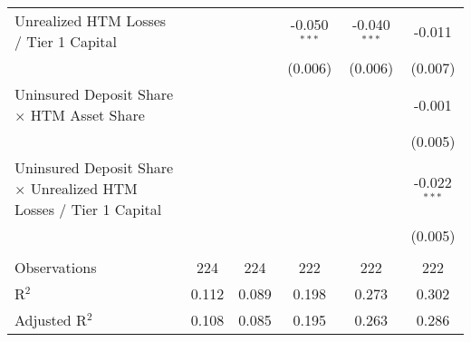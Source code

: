 \begin{table}[htbp]
\begin{adjustbox}{width = 1.2\textwidth, center}
\begin{tabular}{lccccc}
         Unrealized HTM Losses / Tier 1 Capital                                   &                &                & -0.050$^{***}$ & -0.040$^{***}$ & -0.011\\   
                                                                                  &                &                & (0.006)        & (0.006)        & (0.007)\\   
         Uninsured Deposit Share $\times$ HTM Asset Share                         &                &                &                &                & -0.001\\   
                                                                                  &                &                &                &                & (0.005)\\   
         Uninsured Deposit Share $\times$ Unrealized HTM Losses / Tier 1 Capital  &                &                &                &                & -0.022$^{***}$\\   
                                                                                  &                &                &                &                & (0.005)\\   
          \\
         Observations                                                             & 224            & 224            & 222            & 222            & 222\\  
         R$^2$                                                                    & 0.112          & 0.089          & 0.198          & 0.273          & 0.302\\  
         Adjusted R$^2$                                                           & 0.108          & 0.085          & 0.195          & 0.263          & 0.286\\  
         \bottomrule
      \end{tabular}
   \end{adjustbox}
\end{table}


